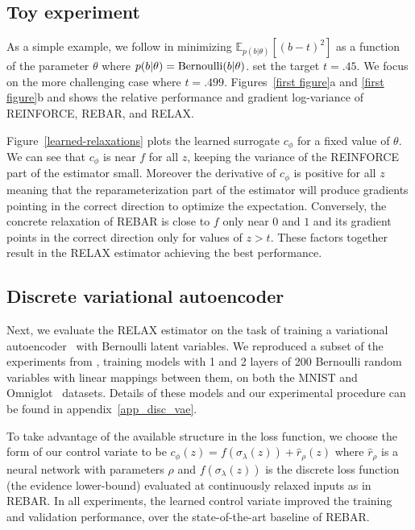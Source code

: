 \documentclass{article}
\newcommand{\RELAX}{{\textnormal{RELAX}}}
\begin{document}
\subsection{Toy experiment}
As a simple example, we follow \citet{tucker2017rebar} in minimizing $\mathbb{E}_{p(b|\theta)}[(b - t)^2]$ as a function of the parameter $\theta$ where {$p(b|\theta) = \textnormal{Bernoulli}(b|\theta)$}.
\citet{tucker2017rebar} set the target $t = .45$.
We focus on the more challenging case where $t = .499$.
Figures~\ref{first figure}a and \ref{first figure}b and shows the relative performance and gradient log-variance of REINFORCE, REBAR, and RELAX.


Figure~\ref{learned-relaxations} plots the learned surrogate $c_\phi$ for a fixed value of $\theta$. We can see that $c_\phi$ is near $f$ for all $z$, keeping the variance of the REINFORCE part of the estimator small. Moreover the derivative of $c_\phi$ is positive for all $z$ meaning that the reparameterization part of the estimator will produce gradients pointing in the correct direction to optimize the expectation. Conversely, the concrete relaxation of REBAR is close to $f$ only near $0$ and $1$ and its gradient points in the correct direction only for values of $z > t$. These factors together result in the RELAX estimator achieving the best performance. 

\subsection{Discrete variational autoencoder}
Next, we evaluate the \RELAX{} estimator on the task of training a variational autoencoder~\citep{kingma2013autoencoding, rezende2014stochastic} with Bernoulli latent variables.
We reproduced a subset of the experiments from \citet{tucker2017rebar}, training models with 1 and 2 layers of 200 Bernoulli random variables with linear mappings between them, on both  the MNIST and Omniglot~\citep{lake2015human} datasets.
Details of these models and our experimental procedure can be found in appendix~\ref{app_disc_vae}.

To take advantage of the available structure in the loss function, we choose the form of our control variate to be $c_\phi(z) = f(\sigma_\lambda(z))+  \hat{r}_\rho(z)$ where $\hat{r}_\rho$ is a neural network with parameters $\rho$ and $f(\sigma_\lambda(z))$ is the discrete loss function (the evidence lower-bound) evaluated at continuously relaxed inputs as in REBAR.  
%
In all experiments, the learned control variate improved the training and validation performance, over the state-of-the-art baseline of REBAR. 
\end{document}
